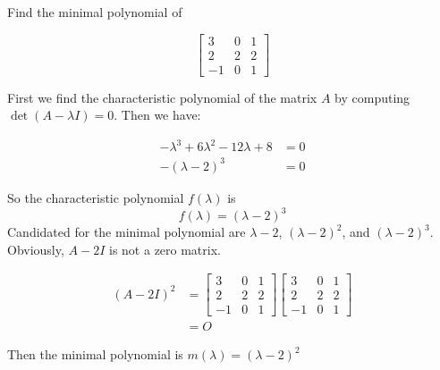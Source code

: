 \begin{homeworkProblem}

Find the minimal polynomial of

\[
  \begin{bmatrix}
    3 & 0 & 1 \\
    2 & 2  & 2 \\
    -1 & 0 & 1
  \end{bmatrix}
\]

\solution

First we find the characteristic polynomial of the matrix $A$ by computing $\det(A -\lambda I) = 0$. Then we have:

\[
  \begin{aligned}
  -\lambda^3 + 6\lambda^2 -12\lambda +8 &= 0\\
  -(\lambda-2)^3 &= 0
  \end{aligned}
\]

So the characteristic polynomial $f(\lambda)$ is
\[
  f(\lambda) = (\lambda - 2)^3
\]
Candidated for the minimal polynomial are $\lambda - 2$, $(\lambda - 2)^2$, and $(\lambda - 2)^3$. Obviously, $A -2I$ is not a zero matrix.

\[
  \begin{aligned}
    (A-2I)^2 &= \begin{bmatrix}
      3 & 0 & 1 \\
      2 & 2  & 2 \\
      -1 & 0 & 1
    \end{bmatrix} \begin{bmatrix}
      3 & 0 & 1 \\
      2 & 2  & 2 \\
      -1 & 0 & 1
    \end{bmatrix} \\
    &= O
  \end{aligned}
\]

Then the minimal polynomial is $m(\lambda) = (\lambda - 2)^2$

\end{homeworkProblem}
